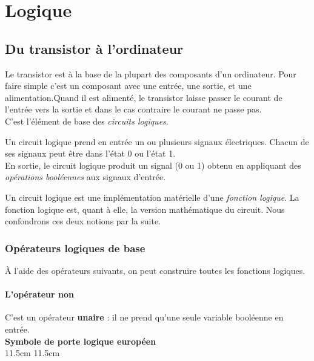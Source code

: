 \documentclass[a5paper,12pt,french]{book}
\begin{document}
\chapter*{Logique}

\section{Du transistor à l'ordinateur}

Le transistor est à la base de la plupart des composants d'un ordinateur. Pour faire simple c'est un composant avec une entrée, une sortie, et une alimentation.Quand il est alimenté, le transistor laisse passer le courant de l'entrée vers la sortie et dans le cas contraire le courant ne passe pas.\\
C'est l'élément de base des \textit{circuits logiques}. 

\newpage
\begin{definition}
	Un circuit logique prend en entrée un ou plusieurs signaux électriques. Chacun de ses signaux peut être dans l'état 0 ou l'état 1.\\
	En sortie, le circuit logique produit un signal (0 ou 1) obtenu en appliquant des \textit{opérations booléennes} aux signaux d'entrée.
\end{definition}

Un circuit logique est une implémentation matérielle d'une \textit{fonction logique}. La fonction logique est, quant à elle, la version \og mathématique\fg{} du circuit. Nous confondrons ces deux notions par la suite.
\newpage
\subsection{Opérateurs logiques de base}

À l'aide des opérateurs suivants, on peut construire toutes les fonctions logiques.
\newpage
\subsubsection*{L'opérateur \og non\fg{}}

C'est un opérateur \textbf{unaire} : il ne prend qu'une seule variable booléenne en entrée.\\

{
	\textbf{Symbole de porte logique européen}\\}{11.5cm}
{
	}{11.5cm}
\end{document}
